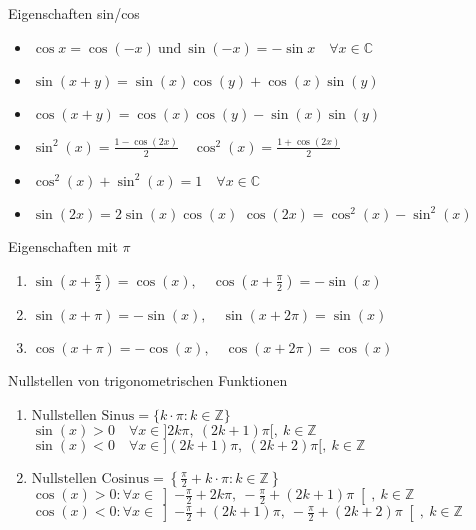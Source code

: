 \begin{theorem}{Eigenschaften sin/cos}
    \begin{itemize}
        \item $\cos x = \cos(-x) ~\text{und}~ \sin(-x) = -\sin x \quad\forall x \in \mathbb{C}$
        \item $\sin(x + y) = \sin(x)\cos(y) + \cos(x)\sin(y)$
        \item $\cos(x + y) = \cos(x)\cos(y) - \sin(x)\sin(y)$
        \item $\sin^2(x) = \frac{1 - \cos(2x)}{2} \quad \cos^2(x) = \frac{1 + \cos(2x)}{2}$
        \item $\cos^2(x) + \sin^2(x) = 1 \quad \forall x \in \mathbb{C}$ 
        \item $\sin(2x) = 2 \sin(x)\cos(x)$ \hspace{4mm} $\cos(2x) = \cos^2(x) - \sin^2(x)$
    \end{itemize} 
 \end{theorem}
 
 \begin{corollary}{Eigenschaften mit $\pi$}
     \begin{enumerate}[itemsep= 2pt]
         \item $\sin(x + \frac{\pi}{2}) = \cos(x), \quad \cos(x + \frac{\pi}{2}) = -\sin(x)$
         \item $\sin(x+\pi) = -\sin (x), \quad \sin(x + 2\pi) = \sin(x)$
         \item $\cos(x+\pi) = -\cos (x), \quad \cos(x + 2\pi) = \cos(x)$
     \end{enumerate}
 \end{corollary}

 \begin{corollary}{Nullstellen von trigonometrischen Funktionen}
    \begin{enumerate}
         \item $\text{Nullstellen Sinus} = \{k\cdot \pi : k\in \mathbb{Z}\}$\\
        $\sin(x) > 0 \quad \forall x \in ]2k\pi, ~(2k+1)\pi[, ~ k\in \mathbb{Z}$\\[2pt]
        $\sin(x) < 0 \quad \forall x \in ](2k + 1)\pi, ~(2k+2)\pi[, ~ k\in \mathbb{Z}$
        \item $\text{Nullstellen Cosinus} = \left\{\frac{\pi}{2}+k\cdot \pi : k\in \mathbb{Z}\right\}$\\
        $\cos(x) > 0:\forall x \in \left]-\frac{\pi}{2} +2k\pi, ~-\frac{\pi}{2} +(2k+1)\pi\right[, ~ k\in \mathbb{Z}$\\[2pt]
        $\cos(x) < 0:\forall x \in \left]-\frac{\pi}{2} + (2k + 1)\pi, ~-\frac{\pi}{2} +(2k+2)\pi\right[, ~ k\in \mathbb{Z}$
    \end{enumerate}
\end{corollary}
 


